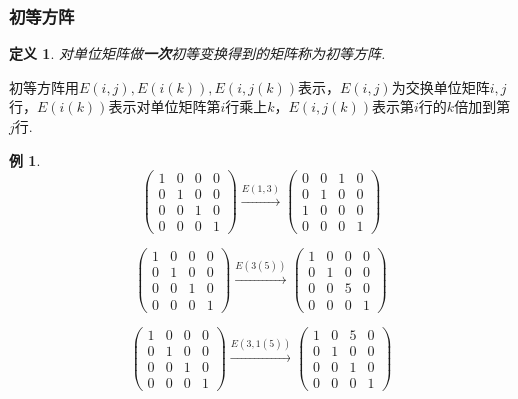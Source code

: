 \documentclass[12pt, a4paper, oneside]{ctexbook}
\newtheorem{definition}[theorem]{定义}
\newtheorem{example}[theorem]{例}
\begin{document}
\subsubsection{初等方阵}

\begin{definition}
    对单位矩阵做\textbf{一次}初等变换得到的矩阵称为初等方阵. 
\end{definition}

初等方阵用$E(i,j), E(i(k)), E(i,j(k))$表示，$E(i,j)$为交换单位矩阵$i,j$行，$E(i(k))$表示对单位矩阵第$i$行乘上$k$，$E(i,j(k))$表示第$i$行的$k$倍加到第$j$行. 

\begin{example}
    $$\begin{pmatrix}
        1 & 0 & 0 & 0 \\
        0 & 1 & 0 & 0 \\
        0 & 0 & 1 & 0 \\
        0 & 0 & 0 & 1
    \end{pmatrix} \xrightarrow{E(1,3)} \begin{pmatrix}
        0 & 0 & 1 & 0 \\
        0 & 1 & 0 & 0 \\
        1 & 0 & 0 & 0 \\
        0 & 0 & 0 & 1
    \end{pmatrix}$$

    $$\begin{pmatrix}
        1 & 0 & 0 & 0 \\
        0 & 1 & 0 & 0 \\
        0 & 0 & 1 & 0 \\
        0 & 0 & 0 & 1
    \end{pmatrix} \xrightarrow{E(3(5))} \begin{pmatrix}
        1 & 0 & 0 & 0 \\
        0 & 1 & 0 & 0 \\
        0 & 0 & 5 & 0 \\
        0 & 0 & 0 & 1
    \end{pmatrix}$$

    $$\begin{pmatrix}
        1 & 0 & 0 & 0 \\
        0 & 1 & 0 & 0 \\
        0 & 0 & 1 & 0 \\
        0 & 0 & 0 & 1
    \end{pmatrix} \xrightarrow{E(3,1(5))} \begin{pmatrix}
        1 & 0 & 5 & 0 \\
        0 & 1 & 0 & 0 \\
        0 & 0 & 1 & 0 \\
        0 & 0 & 0 & 1
    \end{pmatrix}$$
\end{example}
\end{document}
